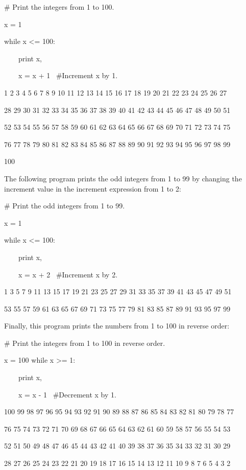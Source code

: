 \documentclass[12pt,oneside]{book}
\begin{document}
\# Print the integers from 1 to 100.


x = 1 


while x {\textless}= 100:

\ \ \ \ print x,

\ \ \ \ x = x + 1 \ \#Increment x by 1.

{\textbar}

1 2 3 4 5 6 7 8 9 10 11 12 13 14 15 16 17 18 19 20 21 22 23 24 25 26 27

28 29 30 31 32 33 34 35 36 37 38 39 40 41 42 43 44 45 46 47 48 49 50 51

52 53 54 55 56 57 58 59 60 61 62 63 64 65 66 67 68 69 70 71 72 73 74 75

76 77 78 79 80 81 82 83 84 85 86 87 88 89 90 91 92 93 94 95 96 97 98 99

100 

The following program prints the odd integers from 1 to 99 by changing the increment value in the increment expression from 1 to 2: 

\# Print the odd integers from 1 to 99.


x = 1 


while x {\textless}= 100:

\ \ \ \ print x,

\ \ \ \ x = x + 2 \ \#Increment x by 2.

{\textbar}

1 3 5 7 9 11 13 15 17 19 21 23 25 27 29 31 33 35 37 39 41 43 45 47 49 51

53 55 57 59 61 63 65 67 69 71 73 75 77 79 81 83 85 87 89 91 93 95 97 99 

Finally, this program prints the numbers from 1 to 100 in reverse order:


\# Print the integers from 1 to 100 in reverse order.


x = 100 
while x {\textgreater}= 1:

\ \ \ \ print x,

\ \ \ \ x = x {}- 1 \ \#Decrement x by 1.

{\textbar}

100 99 98 97 96 95 94 93 92 91 90 89 88 87 86 85 84 83 82 81 80 79 78 77

76 75 74 73 72 71 70 69 68 67 66 65 64 63 62 61 60 59 58 57 56 55 54 53

52 51 50 49 48 47 46 45 44 43 42 41 40 39 38 37 36 35 34 33 32 31 30 29

28 27 26 25 24 23 22 21 20 19 18 17 16 15 14 13 12 11 10 9 8 7 6 5 4 3 2
\end{document}
